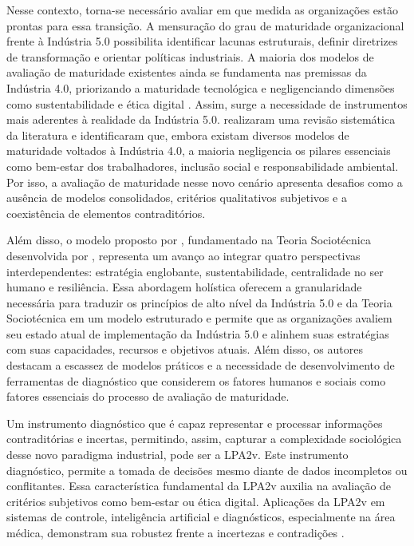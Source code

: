 Nesse contexto, torna-se necessário avaliar em que medida as organizações estão prontas para essa transição. A mensuração do grau de maturidade organizacional frente à Indústria 5.0 possibilita identificar lacunas estruturais, definir diretrizes de transformação e orientar políticas industriais. A maioria dos modelos de avaliação de maturidade existentes ainda se fundamenta nas premissas da Indústria 4.0, priorizando a maturidade tecnológica e negligenciando dimensões como sustentabilidade e ética digital \cite{Lucato2019,HeinPensel2023}. Assim, surge a necessidade de instrumentos mais aderentes à realidade da Indústria 5.0.  realizaram uma revisão sistemática da literatura e identificaram que, embora existam diversos modelos de maturidade voltados à Indústria 4.0, a maioria negligencia os pilares essenciais como bem-estar dos trabalhadores, inclusão social e responsabilidade ambiental. Por isso, a avaliação de maturidade nesse novo cenário apresenta desafios como a ausência de modelos consolidados, critérios qualitativos subjetivos e a coexistência de elementos contraditórios.

Além disso, o modelo proposto por , fundamentado na Teoria Sociotécnica desenvolvida por , representa um avanço ao integrar quatro perspectivas interdependentes: estratégia englobante, sustentabilidade, centralidade no ser humano e resiliência. Essa abordagem holística oferecem a granularidade necessária para traduzir os princípios de alto nível da Indústria 5.0 e da Teoria Sociotécnica em um modelo estruturado e permite que as organizações avaliem seu estado atual de implementação da Indústria 5.0 e alinhem suas estratégias com suas capacidades, recursos e objetivos atuais. Além disso, os autores destacam a escassez de modelos práticos e a necessidade de desenvolvimento de ferramentas de diagnóstico que considerem os fatores humanos e sociais como fatores essenciais do processo de avaliação de maturidade.

Um instrumento diagnóstico que é capaz representar e processar informações contraditórias e incertas, permitindo, assim, capturar a complexidade sociológica desse novo paradigma industrial, pode ser a \gls{LPA2v}. Este instrumento diagnóstico, permite a tomada de decisões mesmo diante de dados incompletos ou conflitantes. Essa característica fundamental da \gls{LPA2v} auxilia na avaliação de critérios subjetivos como bem-estar ou ética digital. Aplicações da LPA2v em sistemas de controle, inteligência artificial e diagnósticos, especialmente na área médica, demonstram sua robustez frente a incertezas e contradições \cite{SilvaFilho1999, CarvalhoBrunsteinAbe2003, CarvalhoJunior2024}.

